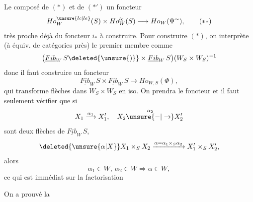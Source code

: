 Le composé de $(*)$ et de $(*')$   un foncteur
\[
 Ho^{\unsure{lc|le}}_W(S)\times Ho^{lc}_W(S)\longrightarrow Ho_W(\Psi^{\sim}),
 \tag*{$(**)$}
\]
très proche déjà du foncteur $i_*$ à construire. Pour construire $(*)$, on interprète (à équiv. de catégories près) le premier membre comme
\[
 \bigl(\underline{Fib}_W\,S\deleted{\unsure{)}}\times
 \underline{Fib}_W\,S\bigr)(W_S\times W_S)^{-1}
\]
donc il faut construire un foncteur
\[
 \underline{Fib}_W\,S\times\underline{Fib}_W\,S\longrightarrow Ho_{W,S}(\Phi),
\]
qui transforme flèches dans $W_S\times W_S$ en iso. On prendra le foncteur
et il faut seulement vérifier que si
\[
 X_1\xrightarrow{\alpha_1}X'_1,\quad X_2\overset{\alpha_2}{\unsure{-|\to}}X'_2
\]
sont deux flèches de $\underline{Fib}_W\,S$, 
\[
 \deleted{\unsure{\alpha|X}}X_1\times_S X_2\xrightarrow{\alpha=\alpha_1\times_S\alpha_2}X'_1\times_S X'_2,
\]
alors
\[
 \alpha_1\in W,\ \alpha_2\in W\Longrightarrow\alpha\in W,
\]
ce qui est immédiat sur la factorisation


On a prouvé la

